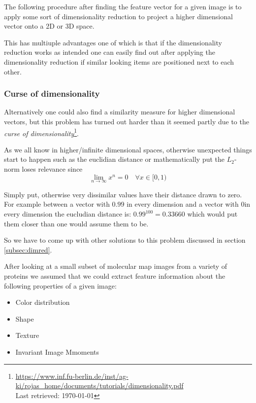 \documentclass[journal]{vgtc}       %
\begin{document}
The following procedure after finding the feature vector for a given image is to apply some sort of dimensionality reduction to project a higher dimensional vector onto a 2D or 3D space.

This has multiuple advantages one of which is that if the dimensionality reduction works as intended one can easily find out after applying the dimensionality reduction if similar looking items are positioned next to each other.

\subsubsection{Curse of dimensionality}
Alternatively one could also find a similarity measure for higher dimensional vectors, but this problem has turned out harder than it seemed partly due to the \textit{curse of dimensionality}\footnote{\url{https://www.inf.fu-berlin.de/inst/ag-ki/rojas_home/documents/tutorials/dimensionality.pdf}\\ Last retrieved: \today}.


As we all know in higher/infinite dimensional spaces, otherwise unexpected things start to happen such as the euclidian distance or mathematically put the \(L_2\)-norm loses relevance since
\begin{equation}
\lim_{n\rightarrow \infty} x^n = 0 \quad \forall x \in [0,1)
\end{equation}

Simply put, otherwise very dissimilar values have their distance drawn to zero. For example between a vector with \(0.99\) in every dimension and a vector with \(0\)in every dimension the eucludian distance is: \(0.99^{100} = 0.33660\) which would put them closer than one would assume them to be.

So we have to come up with other solutions to this problem discussed in section \ref{subsec:dimred}. %

After looking at a small subset of molecular map images from a variety of proteins we assumed that we could  extract feature information about the following properties of a given image: 
\begin{itemize}
  \item Color distribution
  \item Shape
  \item Texture
  \item Invariant  Image Mmoments 
\end{itemize}
\end{document}
